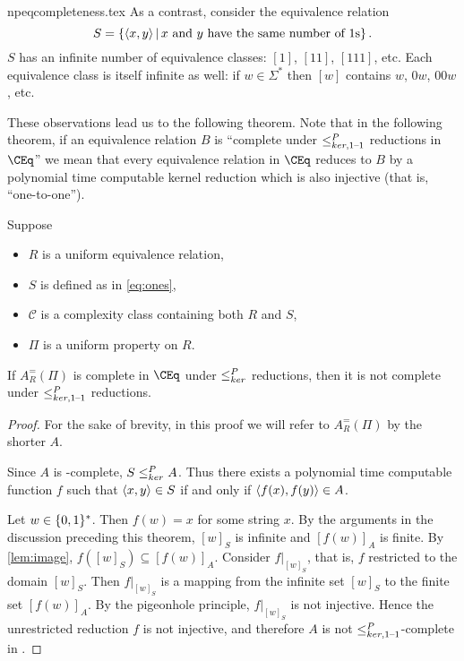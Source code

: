 \begin{filecontents}{npeqcompleteness.tex}
As a contrast, consider the equivalence relation
\begin{equation}\label{eq:ones}
  S = \lb\pair{x}{y} \st x\plain{and}y\plain{have the same number of}1\textnormal{s}\rb.
\end{equation}
$S$ has an infinite number of equivalence classes: $[1]$, $[11]$, $[111]$, etc.
Each equivalence class is itself infinite as well: if $w\in\Sigma^*$ then $[w]$ contains $w$, $0w$, $00w$, etc.

These observations lead us to the following theorem.
Note that in the following theorem, if an equivalence relation $B$ is ``complete under $\kri$ reductions in $\CEq$'' we mean that every equivalence relation in $\CEq$ reduces to $B$ by a polynomial time computable kernel reduction which is also injective (that is, ``one-to-one'').

\begin{theorem}
  Suppose
  \begin{itemize}
  \item $R$ is a uniform equivalence relation,
  \item $S$ is defined as in \eqref{eq:ones},
  \item $\mathcal{C}$ is a complexity class containing both $R$ and $S$,
  \item $\Pi$ is a uniform property on $R$.
  \end{itemize}
  If $A_R^=(\Pi)$ is complete in $\CEq$ under $\kr$ reductions, then it is not complete under $\kri$ reductions.
\end{theorem}
\begin{proof}
  For the sake of brevity, in this proof we will refer to $A_R^=(\Pi)$ by the shorter $A$.

  Since $A$ is \CEq-complete, $S \kr A$.
  Thus there exists a polynomial time computable function $f$ such that $\pair{x}{y}\in S$ if and only if $\pair{f(x)}{f(y)}\in A$.

  Let $w\in\sigmastar$.
  Then $f(w)=x$ for some string $x$.
  By the arguments in the discussion preceding this theorem, $[w]_S$ is infinite and $[f(w)]_A$ is finite.
  By \ref{lem:image}, $f([w]_S)\subseteq [f(w)]_A$.
  Consider $f|_{[w]_S}$, that is, $f$ restricted to the domain $[w]_S$.
  Then $f|_{[w]_S}$ is a mapping from the infinite set $[w]_S$ to the finite set $[f(w)]_A$.
  By the pigeonhole principle, $f|_{[w]_S}$ is not injective.
  Hence the unrestricted reduction $f$ is not injective, and therefore $A$ is not $\kri$-complete in \CEq.
\end{proof}


\end{filecontents}
